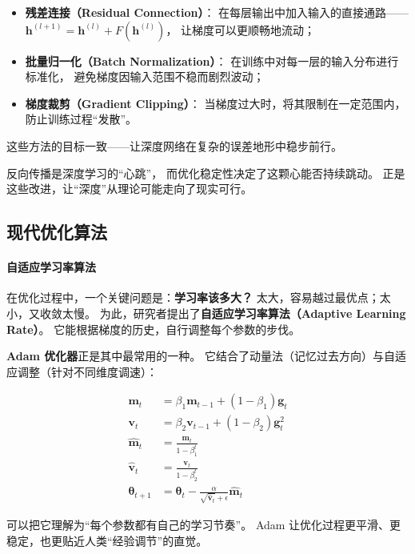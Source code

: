 \begin{itemize}
\item \textbf{残差连接（Residual Connection）}：  
在每层输出中加入输入的直接通路——$\mathbf{h}^{(l+1)} = \mathbf{h}^{(l)} + F(\mathbf{h}^{(l)})$，  
让梯度可以更顺畅地流动；
\item \textbf{批量归一化（Batch Normalization）}：  
在训练中对每一层的输入分布进行标准化，  
避免梯度因输入范围不稳而剧烈波动；
\item \textbf{梯度裁剪（Gradient Clipping）}：  
当梯度过大时，将其限制在一定范围内，  
防止训练过程“发散”。
\end{itemize}

这些方法的目标一致——让深度网络在复杂的误差地形中稳步前行。

反向传播是深度学习的“心跳”，  
而优化稳定性决定了这颗心能否持续跳动。  
正是这些改进，让“深度”从理论可能走向了现实可行。

\subsection{现代优化算法}

\paragraph{自适应学习率算法}  
在优化过程中，一个关键问题是：\textbf{学习率该多大？}  
太大，容易越过最优点；太小，又收敛太慢。  
为此，研究者提出了\textbf{自适应学习率算法（Adaptive Learning Rate）}。  
它能根据梯度的历史，自行调整每个参数的步伐。  

\textbf{Adam 优化器}正是其中最常用的一种。  
它结合了动量法（记忆过去方向）与自适应调整（针对不同维度调速）：  

\begin{align}
\mathbf{m}_t &= \beta_1 \mathbf{m}_{t-1} + (1-\beta_1) \mathbf{g}_t \\
\mathbf{v}_t &= \beta_2 \mathbf{v}_{t-1} + (1-\beta_2) \mathbf{g}_t^2 \\
\hat{\mathbf{m}}_t &= \frac{\mathbf{m}_t}{1-\beta_1^t} \\
\hat{\mathbf{v}}_t &= \frac{\mathbf{v}_t}{1-\beta_2^t} \\
\boldsymbol{\theta}_{t+1} &= \boldsymbol{\theta}_t - \frac{\alpha}{\sqrt{\hat{\mathbf{v}}_t} + \epsilon} \hat{\mathbf{m}}_t
\end{align}

可以把它理解为“每个参数都有自己的学习节奏”。  
Adam 让优化过程更平滑、更稳定，也更贴近人类“经验调节”的直觉。

